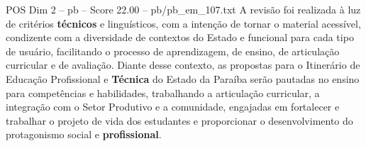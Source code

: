 \begin{textsample}{POS Dim 2 – pb – Score 22.00 – pb/pb\_em\_107.txt}
A revisão foi realizada à luz de critérios \textbf{técnicos} e linguísticos, com a intenção de tornar o material acessível, condizente com a diversidade de contextos do Estado e funcional para cada tipo de usuário, facilitando o processo de aprendizagem, de ensino, de articulação curricular e de avaliação.
Diante desse contexto, as propostas para o Itinerário de Educação Profissional e \textbf{Técnica} do Estado da Paraíba serão pautadas no ensino para competências e habilidades, trabalhando a articulação curricular, a integração com o Setor Produtivo e a comunidade, engajadas em fortalecer e trabalhar o projeto de vida dos estudantes e proporcionar o desenvolvimento do protagonismo social e \textbf{profissional}.

\end{textsample}
